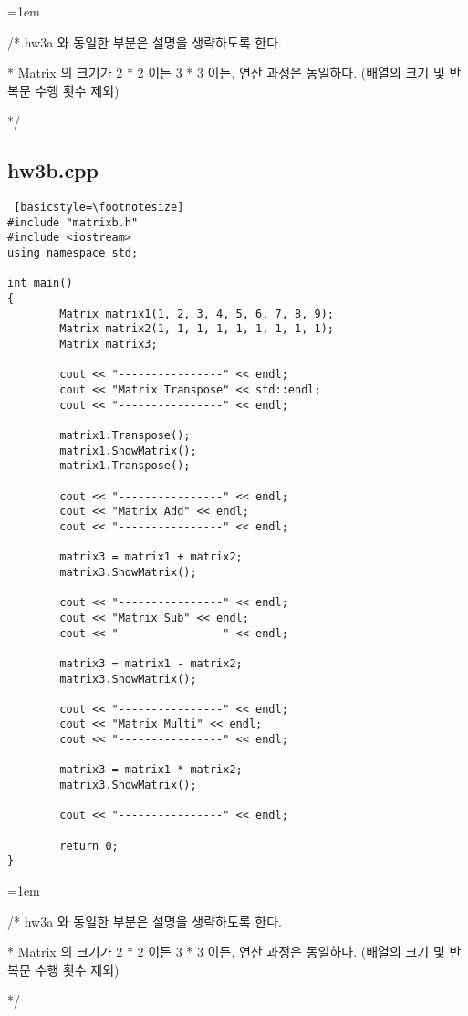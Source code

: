 \documentclass[twoside,twocolumn]{article}
\newenvironment{itemizeReduced}{
\begin{list}{\labelitemi}{\leftmargin=1em}
\setlength{\itemsep}{1pt}
\setlength{\parskip}{0pt}
\setlength{\parsep}{0pt}}{\end{list}
}
\begin{document}
\begin{itemizeReduced}
    \item[/*] hw3a 와 동일한 부분은 설명을 생략하도록 한다.
    \item[*] Matrix 의 크기가 2 * 2 이든 3 * 3 이든, 연산 과정은 동일하다. (배열의 크기 및 반복문 수행 횟수 제외)
\end{itemizeReduced}
*/

\subsection{hw3b.cpp}
\begin{lstlisting} [basicstyle=\footnotesize]
#include "matrixb.h"
#include <iostream>
using namespace std;

int main()
{
        Matrix matrix1(1, 2, 3, 4, 5, 6, 7, 8, 9);
        Matrix matrix2(1, 1, 1, 1, 1, 1, 1, 1, 1);
        Matrix matrix3;

        cout << "----------------" << endl;
        cout << "Matrix Transpose" << std::endl;
        cout << "----------------" << endl;

        matrix1.Transpose();
        matrix1.ShowMatrix();
        matrix1.Transpose();

        cout << "----------------" << endl;
        cout << "Matrix Add" << endl;
        cout << "----------------" << endl;

        matrix3 = matrix1 + matrix2;
        matrix3.ShowMatrix();

        cout << "----------------" << endl;
        cout << "Matrix Sub" << endl;
        cout << "----------------" << endl;

        matrix3 = matrix1 - matrix2;
        matrix3.ShowMatrix();

        cout << "----------------" << endl;
        cout << "Matrix Multi" << endl;
        cout << "----------------" << endl;

        matrix3 = matrix1 * matrix2;
        matrix3.ShowMatrix();

        cout << "----------------" << endl;

        return 0;
}
\end{lstlisting}
\begin{itemizeReduced}
    \item[/*] hw3a 와 동일한 부분은 설명을 생략하도록 한다.
    \item[*] Matrix 의 크기가 2 * 2 이든 3 * 3 이든, 연산 과정은 동일하다. (배열의 크기 및 반복문 수행 횟수 제외)
\end{itemizeReduced}
*/
\end{document}
